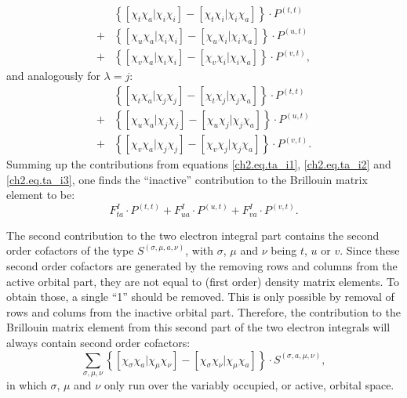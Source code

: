 \begin{equation}
\begin{split}
&\left\{ \left[ \chi_t \chi_a | \chi_i \chi_i \right] - \left[ \chi_t \chi_i | \chi_i \chi_a \right] \right\} \cdot P^{(t,t)}\\
+&\left\{ \left[ \chi_u \chi_a | \chi_i \chi_i \right] - \left[ \chi_u \chi_i | \chi_i \chi_a \right] \right\} \cdot P^{(u,t)}\\
+&\left\{ \left[ \chi_v \chi_a | \chi_i \chi_i \right] - \left[ \chi_v \chi_i | \chi_i \chi_a \right] \right\} \cdot P^{(v,t)},
\end{split}
\label{ch2.eq.ta_i2}
\end{equation} 
and analogously for $\lambda = j$:
\begin{equation}
\begin{split}
&\left\{ \left[ \chi_t \chi_a | \chi_j \chi_j \right] - \left[ \chi_t \chi_j | \chi_j \chi_a \right] \right\} \cdot P^{(t,t)}\\
+&\left\{ \left[ \chi_u \chi_a | \chi_j \chi_j \right] - \left[ \chi_u \chi_j | \chi_j \chi_a \right] \right\} \cdot P^{(u,t)}\\
+&\left\{ \left[ \chi_v \chi_a | \chi_j \chi_j \right] - \left[ \chi_v \chi_j | \chi_j \chi_a \right] \right\} \cdot P^{(v,t)}.
\end{split}
\label{ch2.eq.ta_i3}
\end{equation}
Summing up the contributions from equations \ref{ch2.eq.ta_i1}, \ref{ch2.eq.ta_i2} and \ref{ch2.eq.ta_i3}, one finds the ``inactive'' contribution to the Brillouin matrix element to be:
\begin{equation}
F^{I}_{ta} \cdot P^{(t,t)} + F^{I}_{ua} \cdot P^{(u,t)} + F^{I}_{va} \cdot P^{(v,t)}.
\label{ch2.eq.ta_i4}
\end{equation}

The second contribution to the two electron integral part contains the second order cofactors of the type $S^{(\sigma,\mu,a,\nu)}$, with $\sigma$, $\mu$ and $\nu$ being $t$, $u$ or $v$. Since these second order cofactors are generated by the removing rows and columns from the active orbital part, they are not equal to (first order) density matrix elements. To obtain those, a single ``1'' should be removed. This is only possible by removal of rows and colums from the inactive orbital part. Therefore, the contribution to the Brillouin matrix element from this second part of the two electron integrals will always contain second order cofactors:
\begin{equation}
\sum_{\sigma,\mu,\nu} \left\{ \left[ \chi_\sigma \chi_a | \chi_\mu \chi_\nu \right] - \left[ \chi_\sigma \chi_\nu | \chi_\mu \chi_a \right] \right\} \cdot S^{(\sigma,a,\mu,\nu)},
\label{ch2.eq.ta_i5}
\end{equation}
in which $\sigma$, $\mu$ and $\nu$ only run over the variably occupied, or active, orbital space.

